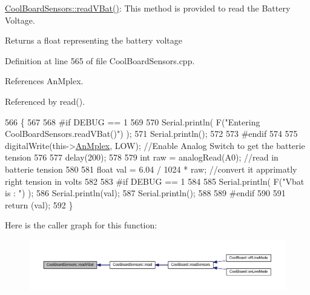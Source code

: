 \hyperlink{classCoolBoardSensors_a6944b6ea7bce8e2fce1b434acfd9d5f3}{Cool\+Board\+Sensors\+::read\+V\+Bat()}\+: This method is provided to read the Battery Voltage.

\begin{DoxyReturn}{Returns}
a float representing the battery voltage 
\end{DoxyReturn}


Definition at line 565 of file Cool\+Board\+Sensors.\+cpp.



References An\+Mplex.



Referenced by read().


\begin{DoxyCode}
566 \{
567 
568 \textcolor{preprocessor}{#if DEBUG == 1}
569 
570     Serial.println( F(\textcolor{stringliteral}{"Entering CoolBoardSensors.readVBat()"}) );
571     Serial.println();
572 
573 \textcolor{preprocessor}{#endif}
574 
575     digitalWrite(this->\hyperlink{classCoolBoardSensors_a12ef28b1046219e0aee10bf64e28c4a5}{AnMplex}, LOW);                            \textcolor{comment}{//Enable Analog Switch to get the
       batterie tension}
576     
577     delay(200);
578     
579     \textcolor{keywordtype}{int} raw = analogRead(A0);                                    \textcolor{comment}{//read in batterie tension}
580     
581     \textcolor{keywordtype}{float} val = 6.04 / 1024 * raw;                               \textcolor{comment}{//convert it apprimatly right tension in
       volts}
582     
583 \textcolor{preprocessor}{#if DEBUG == 1}
584 
585     Serial.println( F(\textcolor{stringliteral}{"Vbat is : "}) );
586     Serial.println(val);
587     Serial.println();
588 
589 \textcolor{preprocessor}{#endif}
590 
591     \textcolor{keywordflow}{return} (val);   
592 \}
\end{DoxyCode}
Here is the caller graph for this function\+:\nopagebreak
\begin{figure}[H]
\begin{center}
\leavevmode
\includegraphics[width=350pt]{classCoolBoardSensors_a6944b6ea7bce8e2fce1b434acfd9d5f3_icgraph}
\end{center}
\end{figure}
\mbox{\label{classCoolBoardSensors_a406307ffd70272282d91479c7ed8d66f}} 
